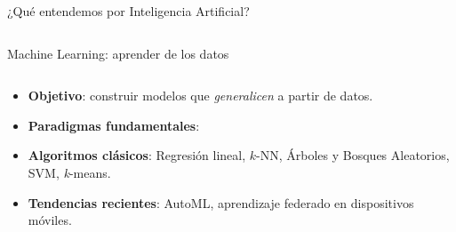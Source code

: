 \documentclass[8pt,spanish]{beamer}
\begin{document}
\begin{frame}[fragile]{¿Qué entendemos por Inteligencia Artificial?}
\begin{columns}[T]
\begin{column}{0.45\textwidth}
\begin{center}
    \vspace{0.6em}
  \end{center}
\end{column}
\end{columns}
\end{frame}

\begin{frame}[fragile]{Machine Learning: aprender de los datos}

\begin{columns}[T]
\begin{column}{0.43\textwidth}
  \begin{itemize}\small
    \item \textbf{Objetivo}: construir modelos que \emph{generalicen} a partir de datos.
    \item \textbf{Paradigmas fundamentales}:
    \item \textbf{Algoritmos clásicos}:  
      Regresión lineal, \(k\)-NN, Árboles y Bosques Aleatorios, SVM, \textit{k}-means.
    \item \textbf{Tendencias recientes}: AutoML, aprendizaje federado en dispositivos móviles.
  \end{itemize}
\end{column}


\end{columns}
\end{frame}
\end{document}
